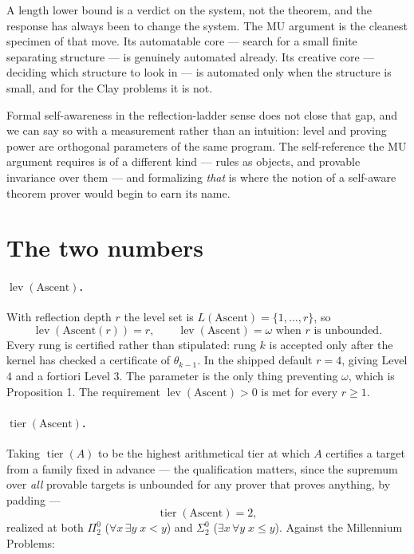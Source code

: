 \documentclass[11pt,a4paper]{article}
\newcommand{\Sig}[2]{\Sigma^{#1}_{#2}}
\newcommand{\Pai}[2]{\Pi^{#1}_{#2}}
\newcommand{\lev}{\operatorname{lev}}
\newcommand{\tier}{\operatorname{tier}}
\begin{document}
A length lower bound is a verdict on the system, not the theorem, and the
response has always been to change the system. The MU argument is the cleanest
specimen of that move. Its automatable core --- search for a small finite
separating structure --- is genuinely automated already. Its creative core ---
deciding which structure to look in --- is automated only when the structure is
small, and for the Clay problems it is not.

Formal self-awareness in the reflection-ladder sense does not close that gap,
and we can say so with a measurement rather than an intuition: level and
proving power are orthogonal parameters of the same program. The self-reference
the MU argument requires is of a different kind --- rules as objects, and
provable invariance over them --- and formalizing \emph{that} is where the
notion of a self-aware theorem prover would begin to earn its name.

\appendix

\section{The two numbers}

\paragraph{$\lev(\text{Ascent})$.} With reflection depth $r$ the level set is
$L(\text{Ascent}) = \{1,\dots,r\}$, so
\[
\lev(\text{Ascent}(r)) = r, \qquad
\lev(\text{Ascent}) = \omega \text{ when } r \text{ is unbounded.}
\]
Every rung is certified rather than stipulated: rung $k$ is accepted only after
the kernel has checked a certificate of $\theta_{k-1}$. In the shipped default
$r = 4$, giving Level 4 and a fortiori Level 3. The parameter is the only thing
preventing $\omega$, which is Proposition 1. The requirement
$\lev(\text{Ascent}) > 0$ is met for every $r \ge 1$.

\paragraph{$\tier(\text{Ascent})$.} Taking $\tier(A)$ to be the highest
arithmetical tier at which $A$ certifies a target from a family fixed in
advance --- the qualification matters, since the supremum over \emph{all}
provable targets is unbounded for any prover that proves anything, by padding
---
\[
\tier(\text{Ascent}) = 2,
\]
realized at both $\Pai{0}{2}$ ($\forall x\,\exists y\; x<y$) and $\Sig{0}{2}$
($\exists x\,\forall y\; x \le y$). Against the Millennium Problems:
\end{document}
